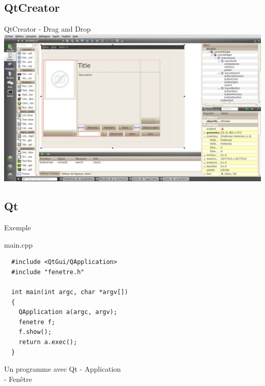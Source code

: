 \documentclass{beamer}
\begin{document}
\subsection*{QtCreator}
\begin{frame}{QtCreator - Drag and Drop}
  \includegraphics[width=\linewidth]{images/qtcreator}\\
\end{frame}

\subsection*{Qt}
\begin{frame}[fragile]{Exemple}

  \begin{scriptsize}
    \begin{block}{main.cpp}

\begin{verbatim}
  #include <QtGui/QApplication>
  #include "fenetre.h"

  int main(int argc, char *argv[])
  {
    QApplication a(argc, argv);
    fenetre f;
    f.show();
    return a.exec();
  }
\end{verbatim}
    \end{block}
  \end{scriptsize}


  \begin{block}{Un programme avec Qt}
    - Application\\
    - Fenêtre
  \end{block}
\end{frame}
\end{document}
